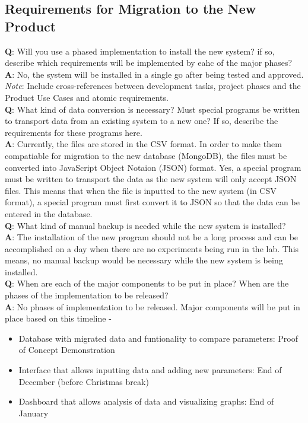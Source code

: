 \documentclass[12pt]{article}
\begin{document}
\subsection{Requirements for Migration to the New Product}
\textbf{Q}: Will you use a phased implementation to install the new system? if
so, describe which requirements will be implemented by eahc of the major
phases?\\
\textbf{A}: No, the system will be installed in a single go after being tested
and approved.\\
\emph{Note}: Include cross-references between development tasks, project phases
and the Product Use Cases and atomic requirements.\\
\newline
\textbf{Q}: What kind of data conversion is necessary? Must special programs be
written to transport data from an existing system to a new one? If so, describe
the requirements for these programs here.\\
\textbf{A}: Currently, the files are stored in the CSV format. In order to make
them compatiable for migration to the new database (MongoDB), the files must be
converted into JavaScript Object Notaion (JSON) format. Yes, a special program
must be written to transport the data as the new system will only accept JSON
files. This means that when the file is inputted to the new system (in CSV
format), a special program must first convert it to JSON so that the data can be
entered in the database.\\
\newline
\textbf{Q}: What kind of manual backup is needed while the new system is
installed?\\
\textbf{A}: The installation of the new program should not be a long process and
can be accomplished on a day when there are no experiments being run in the lab.
This means, no manual backup would be necessary while the new system is being
installed.\\
\newline
\textbf{Q}: When are each of the major components to be put in place? When are
the phases of the implementation to be released?\\
\textbf{A}: No phases of implementation to be released. Major components will be
put in place based on this timeline - 
\begin{itemize}
  \item Database with migrated data and funtionality to compare parameters:
  Proof of Concept Demonstration
  \item Interface that allows inputting data and adding new parameters: End of
  December (before Christmas break)
  \item Dashboard that allows analysis of data and visualizing graphs: End of
  January 
\end{itemize}
\end{document}
